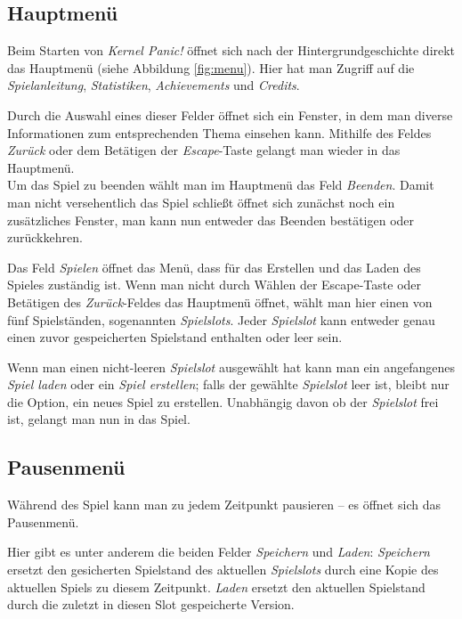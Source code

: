 \subsection{Hauptmenü}\label{sec:menu-main}

Beim Starten von \textit{Kernel Panic!} öffnet sich nach der Hintergrundgeschichte direkt das Hauptmenü (siehe Abbildung \ref{fig:menu}). Hier hat man Zugriff auf die \textit{Spielanleitung}, \textit{Statistiken}, \textit{Achievements} und \textit{Credits}.

Durch die Auswahl eines dieser Felder öffnet sich ein Fenster, in dem man diverse
Informationen zum entsprechenden Thema einsehen kann. Mithilfe des Feldes
\textit{Zurück} oder dem Betätigen der \textit{Escape}-Taste gelangt man wieder in das Hauptmenü.\\
Um das Spiel zu beenden wählt man im Hauptmenü das Feld \textit{Beenden}. Damit man nicht versehentlich das Spiel schließt öffnet sich zunächst noch ein zusätzliches Fenster, man kann nun entweder das Beenden bestätigen oder zurückkehren.

Das Feld \textit{Spielen} öffnet das Menü, dass für das Erstellen und das Laden des Spieles zuständig ist. Wenn man nicht durch Wählen der Escape-Taste oder Betätigen des \textit{Zurück}-Feldes das Hauptmenü öffnet, wählt man hier einen von fünf Spielständen, sogenannten \textit{Spielslots}. Jeder \textit{Spielslot} kann entweder genau einen zuvor gespeicherten Spielstand enthalten oder leer sein.

Wenn man einen nicht-leeren \textit{Spielslot} ausgewählt hat kann man
ein angefangenes \textit{Spiel laden} oder ein \textit{Spiel erstellen}; falls
der gewählte \textit{Spielslot} leer ist, bleibt nur die Option, ein neues Spiel zu erstellen.
Unabhängig davon ob der \textit{Spielslot} frei ist, gelangt man nun in das Spiel.


\subsection{Pausenmenü}\label{sec:menu-pause}

Während des Spiel kann man zu jedem Zeitpunkt pausieren -- es öffnet sich das
Pausenmenü.

Hier gibt es unter anderem die beiden Felder \textit{Speichern} und
\textit{Laden}:
\textit{Speichern} ersetzt den gesicherten Spielstand des aktuellen \textit{Spielslots} durch eine Kopie des aktuellen Spiels zu diesem Zeitpunkt.
\textit{Laden} ersetzt den aktuellen Spielstand durch die zuletzt in diesen
Slot gespeicherte Version.

